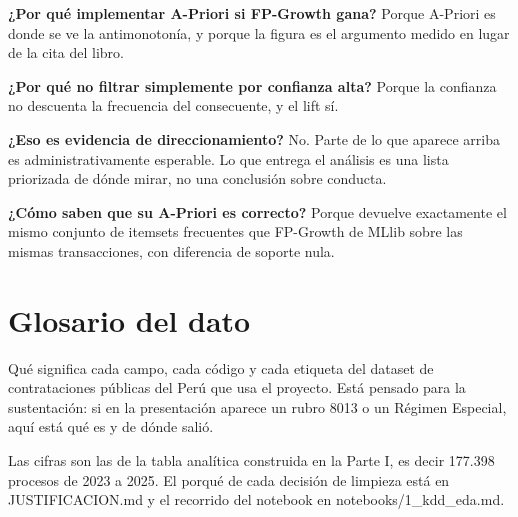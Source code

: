 \documentclass[11pt]{article}
\begin{document}
\textbf{¿Por qué implementar A-Priori si FP-Growth gana?} Porque A-Priori es donde se ve la antimonotonía, y porque la figura es el argumento medido en lugar de la cita del libro.

\textbf{¿Por qué no filtrar simplemente por confianza alta?} Porque la confianza no descuenta la frecuencia del consecuente, y el lift sí.

\textbf{¿Eso es evidencia de direccionamiento?} No. Parte de lo que aparece arriba es administrativamente esperable. Lo que entrega el análisis es una lista priorizada de dónde mirar, no una conclusión sobre conducta.

\textbf{¿Cómo saben que su A-Priori es correcto?} Porque devuelve exactamente el mismo conjunto de itemsets frecuentes que FP-Growth de MLlib sobre las mismas transacciones, con diferencia de soporte nula.


\clearpage
{}
\section*{Glosario del dato}
Qué significa cada campo, cada código y cada etiqueta del dataset de contrataciones públicas del Perú que usa el proyecto. Está pensado para la sustentación: si en la presentación aparece un rubro 8013 o un Régimen Especial, aquí está qué es y de dónde salió.

Las cifras son las de la tabla analítica construida en la Parte I, es decir 177.398 procesos de 2023 a 2025. El porqué de cada decisión de limpieza está en JUSTIFICACION.md y el recorrido del notebook en notebooks/1\_\allowbreak{}kdd\_\allowbreak{}eda.md.

\end{document}
